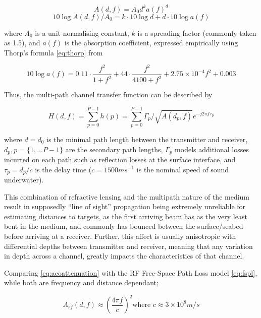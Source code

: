 \documentclass[runningheads,a4paper]{llncs}
\begin{document}
\begin{equation}
  \label{eq:acoattenuation}
  A(d,f) = A_0d^ka(f)^d
\end{equation}
\begin{equation}
  \label{eq:acoattenuationdb}
  10 \log A(d,f)/A_0 = k \cdot 10 \log d + d \cdot 10 \log a(f)
\end{equation}

where $A_0$ is a unit-normalising constant, $k$ is a spreading factor (commonly taken as 1.5), and $a(f)$ is the absorption coefficient, expressed empirically using Thorp's formula \eqref{eq:thorp} from \cite{Stojanovic2007}

\begin{equation}
  \label{eq:thorp}
  10 \log a(f) = 0.11 \cdot \frac{f^2}{1+f^2} + 44\cdot\frac{f^2}{4100+f^2}+ 2.75\times10^{-4} f^2 + 0.003
\end{equation}


Thus, the multi-path channel transfer function can be described by 

\begin{equation}
  \label{eq:acomultipath}
  H(d,f) =\sum_{p=0}^{P-1} h(p) = \sum_{p=0}^{P-1} \Gamma_p / \sqrt{A(d_p,f)}e^{-j 2 \pi f \tau_p}
\end{equation}

where $d=d_0$ is the minimal path length between the transmitter and receiver, $d_p,p=\{1,\dots P-1\}$ are the secondary path lengths, $\Gamma_p$ models additional losses incurred on each path such as reflection losses at the surface interface, and $\tau_p = d_p/c$ is the delay time ($c = 1500 ms^{-1}$ is the nominal speed of sound underwater).


This combination of refractive lensing and the multipath nature of the medium result in supposedly ``line of sight'' propagation being extremely unreliable for estimating distances to targets, as the first arriving beam has as the very least bent in the medium, and commonly has bounced between the surface/seabed before arriving at a receiver.
Further, this affect is usually anisotropic with differential depths between transmitter and receiver, meaning that any variation in depth across a channel, greatly impacts the characteristics of that channel.

Comparing \eqref{eq:acoattenuation} with the RF Free-Space Path Loss model \eqref{eq:fspl}, while both are frequency and distance dependant; 

\begin{equation}
  \label{eq:fspl}
  A_{rf}(d,f) \approx \left( \frac{4\pi f}{c} \right)^2
  \text{where }c\approx 3\times10^8m/s
\end{equation}
\end{document}
